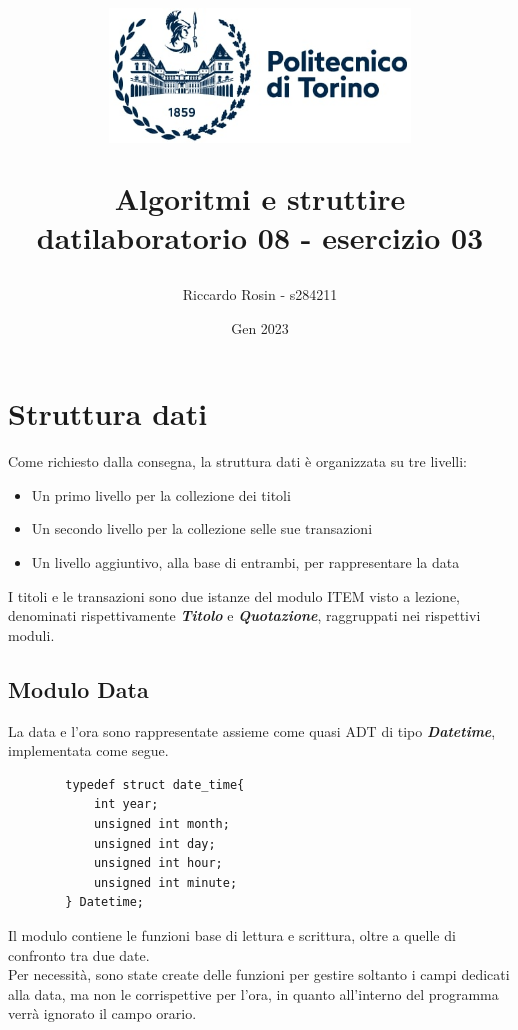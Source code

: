\documentclass[11pt, a4paper, oneside, titlepage]{article}
\title{
  \begin{figure}[t]
    \includegraphics[width=8cm]{logo.jpg}
      \centering
  \end{figure}
  \textbf{Algoritmi e struttire dati\break laboratorio 08 - esercizio 03}
}
\author{Riccardo Rosin - s284211}
\date{Gen 2023}
\begin{document}
    \begin{titlepage}
        \maketitle
    \end{titlepage}

    \tableofcontents
    \pagebreak



    \section{Struttura dati}
    Come richiesto dalla consegna, la struttura dati è organizzata su tre livelli:
    \begin{itemize}
        \item Un primo livello per la collezione dei titoli
        \item Un secondo livello per la collezione selle sue transazioni 
        \item Un livello aggiuntivo, alla base di entrambi, per rappresentare la data
    \end{itemize}
    I titoli e le transazioni sono due istanze del modulo ITEM visto a lezione, denominati rispettivamente \textbf{\textit{Titolo}} e \textbf{\textit{Quotazione}}, 
    raggruppati nei rispettivi moduli.


    \subsection{Modulo Data}
    La data e l'ora sono rappresentate assieme come quasi ADT di tipo \textbf{\textit{Datetime}}, implementata come segue.
    \begin{lstlisting}
        typedef struct date_time{
            int year;
            unsigned int month;
            unsigned int day;
            unsigned int hour;
            unsigned int minute;
        } Datetime;
    \end{lstlisting}
    Il modulo contiene le funzioni base di lettura e scrittura, oltre a quelle di confronto tra due date.\\
    Per necessità, sono state create delle funzioni per gestire soltanto i campi dedicati alla data, ma non le corrispettive per l'ora, 
    in quanto all'interno del programma verrà ignorato il campo orario. 
\end{document}
